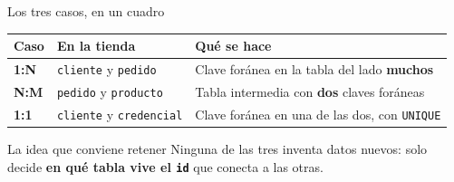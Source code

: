 \documentclass[aspectratio=169,10pt,c]{beamer}
\begin{document}
\begin{frame}{Los tres casos, en un cuadro}
\begin{center}
\small
\begin{tabular}{>{\bfseries}p{1.2cm}>{\raggedright\arraybackslash}p{3.6cm}>{\raggedright\arraybackslash}p{6.4cm}}
\toprule
Caso & En la tienda & Qué se hace \\
\midrule
1:N & \texttt{cliente} y \texttt{pedido} & Clave foránea en la tabla del lado \textbf{muchos} \\
N:M & \texttt{pedido} y \texttt{producto} & Tabla intermedia con \textbf{dos} claves foráneas \\
1:1 & \texttt{cliente} y \texttt{credencial} & Clave foránea en una de las dos, con \texttt{UNIQUE} \\
\bottomrule
\end{tabular}
\end{center}
\vspace{0.35cm}
\begin{block}{La idea que conviene retener}
\small Ninguna de las tres inventa datos nuevos: solo decide \textbf{en qué tabla vive el \texttt{id}} que conecta a las otras.
\end{block}
\end{frame}
\end{document}
